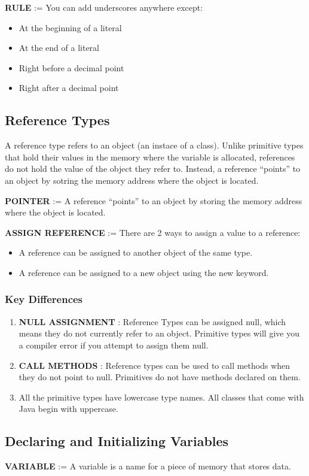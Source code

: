 \documentclass{article}
\begin{document}
\textbf{RULE} := You can add underscores anywhere except:
\begin{itemize}
	\item At the beginning of a literal
	\item At the end of a literal
	\item Right before a decimal point
	\item Right after a decimal point
\end{itemize}

\subsection{Reference Types}

A reference type refers to an object (an instace of a class). Unlike primitive types that hold their values in the memory where the variable is allocated, references do not hold the value of the object they refer to. Instead, a reference ``points'' to an object by sotring the memory address where the object is located.

\textbf{POINTER} := A reference ``points'' to an object by storing the memory address where the object is located.

\textbf{ASSIGN REFERENCE} := There are 2 ways to assign a value to a reference:
\begin{itemize}
	\item A reference can be assigned to another object of the same type.
	\item A reference can be assigned to a new object using the new keyword.
\end{itemize}

\subsubsection{Key Differences}
\begin{enumerate}
	\item\textbf{NULL ASSIGNMENT} : Reference Types can be assigned null, which means they do not currently refer to an object. Primitive types will give you a compiler error if you attempt to assign them null.

	\item\textbf{CALL METHODS} : Reference types can be used to call methods when they do not point to null. Primitives do not have methods declared on them.
	\item All the primitive types have lowercase type names. All classes that come with Java begin with uppercase.
\end{enumerate}

\subsection{Declaring and Initializing Variables}
\textbf{VARIABLE} := A variable is a name for a piece of memory that stores data.
\end{document}
